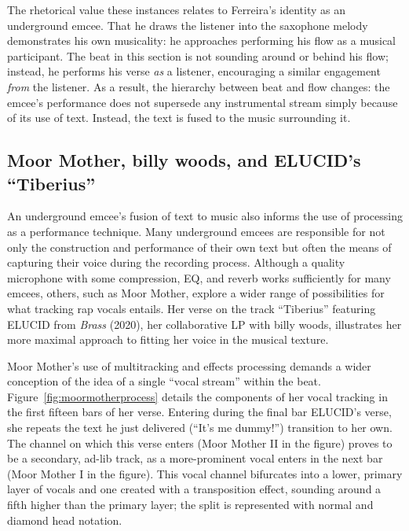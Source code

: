 The rhetorical value these instances relates to Ferreira's identity as an underground emcee. That he draws the
listener into the saxophone melody demonstrates his own musicality: he approaches performing his flow as a musical
participant. The beat in this section is not sounding around or behind his flow; instead, he performs his verse
\emph{as} a listener, encouraging a similar engagement \emph{from} the listener. As a result, the hierarchy between
beat and flow changes: the emcee's performance does not supersede any instrumental stream simply because of its use
of text. Instead, the text is fused to the music surrounding it.

{}
\subsection*{\centering Moor Mother,  billy woods, and ELUCID's ``Tiberius''}

An underground emcee's fusion of text to music also informs the use of processing as a performance technique. Many 
underground emcees are responsible for not only the construction and performance of their own text but often the 
means of capturing their voice during the recording process. Although a quality microphone with some compression, 
EQ, and reverb works sufficiently for many emcees, others, such as Moor Mother, explore a wider range of possibilities
for what tracking rap vocals entails. Her verse on the track ``Tiberius'' featuring ELUCID from \textit{Brass} (2020),
her collaborative LP with billy woods, illustrates her more maximal approach to fitting her voice in the musical texture.

Moor Mother's use of multitracking and effects processing demands a wider conception of the idea of a single ``vocal 
stream'' within the beat. Figure~\ref{fig:moormotherprocess} details the components of her vocal tracking in the 
first fifteen bars of her verse. Entering during the final bar ELUCID's verse, she repeats the text he just delivered
(``It's me dummy!'') transition to her own. The channel on which this verse enters (Moor Mother II in the figure) 
proves to be a secondary, ad-lib track, as a more-prominent vocal enters in the next bar (Moor Mother I in the figure).
This vocal channel bifurcates into a lower, primary layer of vocals and one created with a transposition effect, 
sounding around a fifth higher than the primary layer; the split is represented with normal and diamond head notation.

